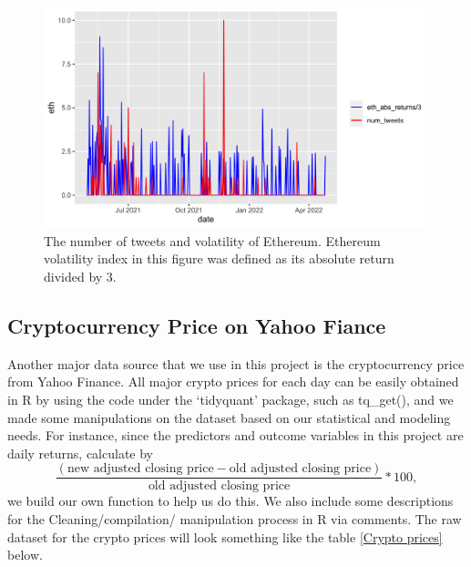 \documentclass{article}
\begin{document}
\begin{figure}[H]
	\centering
	\includegraphics[width=16cm]{../figures/tweets_and_returns.png}
	\caption{The number of tweets and volatility of Ethereum. Ethereum volatility index in this figure was defined as its absolute return divided by 3. }
	\label{fig: tweets_and_returns}
\end{figure}

\subsection{Cryptocurrency Price on Yahoo Fiance}
Another major data source that we use in this project is the cryptocurrency price from Yahoo Finance. All major crypto prices for each day can be easily obtained in R by using the code under the ‘tidyquant’ package, such as tq\_get(), and we made some manipulations on the dataset based on our statistical and modeling needs. For instance, since the predictors and outcome variables in this project are daily returns, calculate by $$\frac{(\text{new adjusted closing price} - \text{old adjusted closing price})}{\text{old adjusted closing price} }*100,$$ we build our own function to help us do this. We also include some descriptions for the Cleaning/compilation/ manipulation process in R via comments. The raw dataset for the crypto prices will look something like the table \ref{Crypto prices} below.
\end{document}
